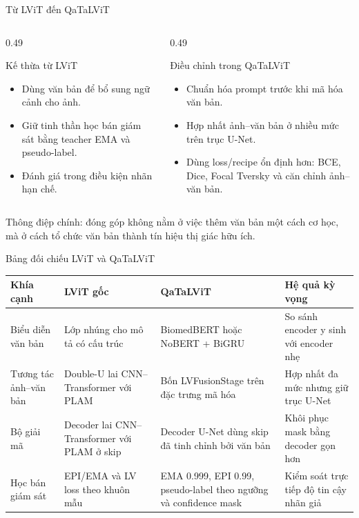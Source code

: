 \documentclass[aspectratio=169,11pt]{beamer}
\newcommand{\smallnote}[1]{%
  \par
  \vspace{0.12cm}
  {\footnotesize\color{ink}#1\par}
}
\newcommand{\twocolsummary}[4]{%
  \begin{columns}[T,totalwidth=\textwidth]
    \begin{column}{0.49\textwidth}
      \begin{block}{#1}
        #2
      \end{block}
    \end{column}
    \begin{column}{0.49\textwidth}
      \begin{block}{#3}
        #4
      \end{block}
    \end{column}
  \end{columns}
}
\begin{document}
\begin{frame}{Từ LViT đến QaTaLViT}
  \twocolsummary
  {Kế thừa từ LViT}
  {
    \begin{itemize}
      \item Dùng văn bản để bổ sung ngữ cảnh cho ảnh.
      \item Giữ tinh thần học bán giám sát bằng teacher EMA và pseudo-label.
      \item Đánh giá trong điều kiện nhãn hạn chế.
    \end{itemize}
  }
  {Điều chỉnh trong QaTaLViT}
  {
    \begin{itemize}
      \item Chuẩn hóa prompt trước khi mã hóa văn bản.
      \item Hợp nhất ảnh--văn bản ở nhiều mức trên trục U-Net.
      \item Dùng loss/recipe ổn định hơn: BCE, Dice, Focal Tversky và căn chỉnh ảnh--văn bản.
    \end{itemize}
  }
  \vspace{0.18cm}
  \smallnote{Thông điệp chính: đóng góp không nằm ở việc thêm văn bản một cách cơ học, mà ở cách tổ chức văn bản thành tín hiệu thị giác hữu ích.}
\end{frame}

\begin{frame}{Bảng đối chiếu LViT và QaTaLViT}
  \scriptsize
  \renewcommand{\arraystretch}{1.13}
  \begin{tabularx}{\textwidth}{@{}lXXX@{}}
    \toprule
    \textbf{Khía cạnh} & \textbf{LViT gốc} & \textbf{QaTaLViT} & \textbf{Hệ quả kỳ vọng} \\
    \midrule
    Biểu diễn văn bản & Lớp nhúng cho mô tả có cấu trúc & BiomedBERT hoặc NoBERT + BiGRU & So sánh encoder y sinh với encoder nhẹ \\
    Tương tác ảnh--văn bản & Double-U lai CNN--Transformer với PLAM & Bốn LVFusionStage trên đặc trưng mã hóa & Hợp nhất đa mức nhưng giữ trục U-Net \\
    Bộ giải mã & Decoder lai CNN--Transformer với PLAM ở skip & Decoder U-Net dùng skip đã tinh chỉnh bởi văn bản & Khôi phục mask bằng decoder gọn hơn \\
    Học bán giám sát & EPI/EMA và LV loss theo khuôn mẫu & EMA 0.999, EPI 0.99, pseudo-label theo ngưỡng và confidence mask & Kiểm soát trực tiếp độ tin cậy nhãn giả \\
    \bottomrule
  \end{tabularx}
\end{frame}
\end{document}
